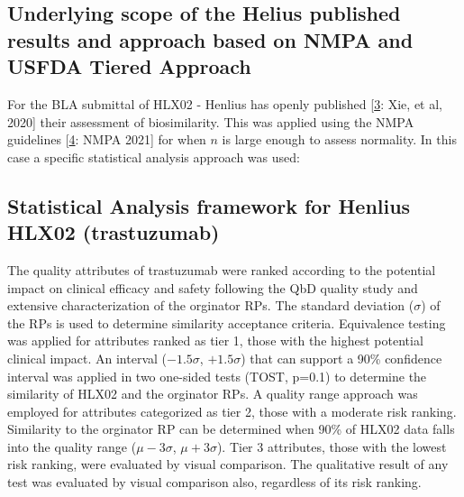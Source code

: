 \documentclass[
  12pt,
  a4paper,
]{article}
\numberwithin{equation}{section}
\theoremstyle{plain}
\theoremstyle{definition}
\theoremstyle{remark}
\theoremstyle{note}
\begin{document}
\hypertarget{underlying-scope-of-the-helius-published-results-and-approach-based-on-nmpa-and-usfda-tiered-approach}{%
\subsection{Underlying scope of the Helius published results and
approach based on NMPA and USFDA Tiered
Approach}\label{underlying-scope-of-the-helius-published-results-and-approach-based-on-nmpa-and-usfda-tiered-approach}}

For the BLA submittal of HLX02 - Henlius has openly published
{[}\protect\hyperlink{ref-xie_demonstrating_2020}{3}: Xie, et al,
2020{]} their assessment of biosimilarity. This was applied using the
NMPA guidelines {[}\protect\hyperlink{ref-noauthor_center_2021}{4}: NMPA
2021{]} for when \(n\) is large enough to assess normality. In this case
a specific statistical analysis approach was used:

\hypertarget{statistical-analysis-framework-for-henlius-hlx02-trastuzumab}{%
\subsection{Statistical Analysis framework for Henlius HLX02
(trastuzumab)}\label{statistical-analysis-framework-for-henlius-hlx02-trastuzumab}}

The quality attributes of trastuzumab were ranked according to the
potential impact on clinical efficacy and safety following the QbD
quality study and extensive characterization of the orginator RPs. The
standard deviation (\(\sigma\)) of the RPs is used to determine
similarity acceptance criteria. Equivalence testing was applied for
attributes ranked as tier 1, those with the highest potential clinical
impact. An interval (\(-1.5\sigma\), \(+1.5\sigma\)) that can support a
90\% confidence interval was applied in two one-sided tests (TOST,
p=0.1) to determine the similarity of HLX02 and the orginator RPs. A
quality range approach was employed for attributes categorized as tier
2, those with a moderate risk ranking. Similarity to the orginator RP
can be determined when 90\% of HLX02 data falls into the quality range
(\(\mu-3\sigma\), \(\mu+3\sigma\)). Tier 3 attributes, those with the
lowest risk ranking, were evaluated by visual comparison. The
qualitative result of any test was evaluated by visual comparison also,
regardless of its risk ranking.
\end{document}
